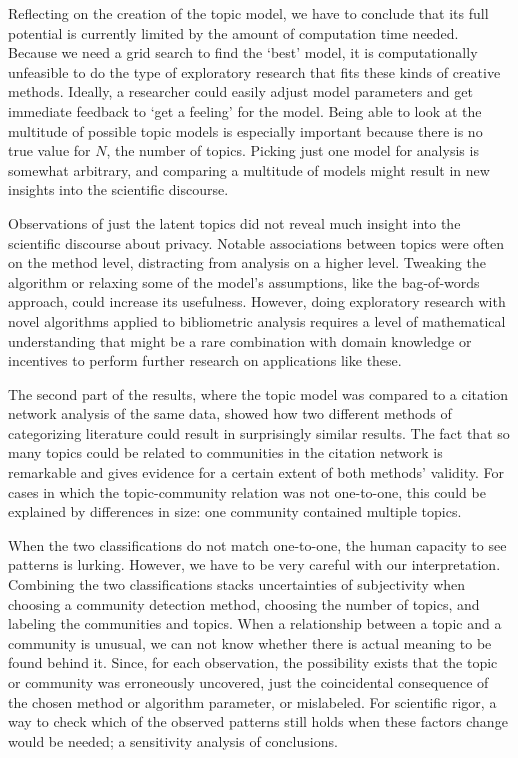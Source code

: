 \documentclass[runningheads]{llncs}
\begin{document}
Reflecting on the creation of the topic model, we have to conclude that its full potential is currently limited by the amount of computation time needed. Because we need a grid search to find the `best' model, it is computationally unfeasible to do the type of exploratory research that fits these kinds of creative methods. Ideally, a researcher could easily adjust model parameters and get immediate feedback to `get a feeling' for the model. Being able to look at the multitude of possible topic models is especially important because there is no true value for $N$, the number of topics. Picking just one model for analysis is somewhat arbitrary, and comparing a multitude of models might result in new insights into the scientific discourse.

Observations of just the latent topics did not reveal much insight into the scientific discourse about privacy. Notable associations between topics were often on the method level, distracting from analysis on a higher level. Tweaking the algorithm or relaxing some of the model's assumptions, like the bag-of-words approach, could increase its usefulness. However, doing exploratory research with novel algorithms applied to bibliometric analysis requires a level of mathematical understanding that might be a rare combination with domain knowledge or incentives to perform further research on applications like these.

The second part of the results, where the topic model was compared to a citation network analysis of the same data, showed how two different methods of categorizing literature could result in surprisingly similar results. The fact that so many topics could be related to communities in the citation network is remarkable and gives evidence for a certain extent of both methods' validity. For cases in which the topic-community relation was not one-to-one, this could be explained by differences in size: one community contained multiple topics.

When the two classifications do not match one-to-one, the human capacity to see patterns is lurking. However, we have to be very careful with our interpretation. Combining the two classifications stacks uncertainties of subjectivity when choosing a community detection method, choosing the number of topics, and labeling the communities and topics. When a relationship between a topic and a community is unusual, we can not know whether there is actual meaning to be found behind it. Since, for each observation, the possibility exists that the topic or community was erroneously uncovered, just the coincidental consequence of the chosen method or algorithm parameter, or mislabeled. For scientific rigor, a way to check which of the observed patterns still holds when these factors change would be needed; a sensitivity analysis of conclusions.
\end{document}
